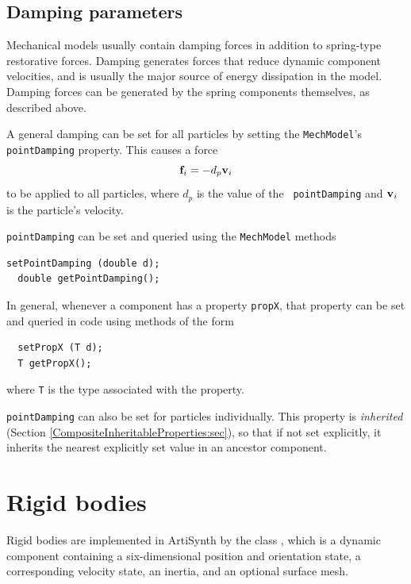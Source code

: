 \subsection{Damping parameters}
\label{BodyDamping:sec}

Mechanical models usually contain damping forces in addition to
spring-type restorative forces. Damping generates forces that reduce
dynamic component velocities, and is usually the major source of
energy dissipation in the model. Damping forces can be generated by
the spring components themselves, as described above.

A general damping can be set for all particles by setting the
{\tt MechModel}'s {\tt pointDamping} property. This causes
a force
%
\begin{equation}
{\bf f}_i = -d_p {\bf v}_i \label{eqn:pointdamping}
\end{equation}
%
to be applied to all particles, where $d_p$ is the value of the {\tt
pointDamping} and ${\bf v}_i$ is the particle's velocity.

{\tt pointDamping} can be set and queried using the {\tt MechModel}
methods
\begin{lstlisting}[]
  setPointDamping (double d);
  double getPointDamping();
\end{lstlisting}
%

\begin{sideblock}
In general, whenever a component has a property {\tt propX}, that
property can be set and queried in code using methods of the form
\begin{verbatim}
  setPropX (T d);
  T getPropX();
\end{verbatim}
where {\tt T} is the type associated with the property.
\end{sideblock}

{\tt pointDamping} can also be set for particles individually.  This
property is {\it inherited} (Section
\ref{CompositeInheritableProperties:sec}), so that if not set
explicitly, it inherits the nearest explicitly set value in an
ancestor component.

\section{Rigid bodies}

Rigid bodies are implemented in ArtiSynth by the class
, which is a dynamic
component containing a six-dimensional position and orientation state,
a corresponding velocity state, an inertia, and an optional surface
mesh.

